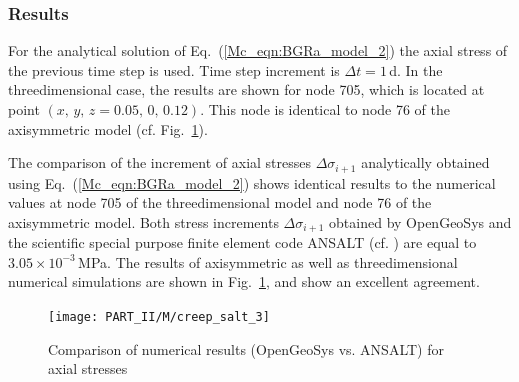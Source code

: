 \subsubsection{Results}
\label{subsubsec:Mc2_res}

For the analytical solution of Eq.~(\ref{Mc_eqn:BGRa_model_2}) the axial stress of the previous time step is used. Time step increment is $\Delta t= 1\,$d. In the threedimensional case, the results are shown for node 705, which is located at point $(x,\,y,\,z=0.05,\,0,\,0.12)$. This node is identical to node 76 of the axisymmetric model (cf. Fig.~\ref{Mc_fig:creep_salt_3}).

The comparison of the increment of axial stresses $\Delta\sigma_{i+1}$ analytically obtained using Eq.~(\ref{Mc_eqn:BGRa_model_2}) shows identical results to the numerical values at node 705 of the threedimensional model and node 76 of the axisymmetric model. Both stress increments $\Delta\sigma_{i+1}$
obtained by OpenGeoSys and the scientific special purpose finite element code ANSALT (cf. \cite{GHKN:1995}) are equal to $3.05\times 10^{-3}\,$MPa. The results of axisymmetric as well as threedimensional numerical simulations are shown in Fig.~\ref{Mc_fig:creep_salt_3}, and show an excellent agreement.
%
\begin{figure}[htb]
\centering
\texttt{[image: PART\_II/M/creep\_salt\_3]}
\caption{Comparison of numerical results (OpenGeoSys vs. ANSALT) for axial stresses}
\label{Mc_fig:creep_salt_3}
\end{figure}
